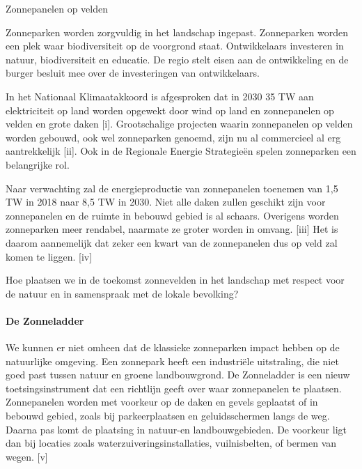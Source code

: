 \begin{voorstel}{Zonnepanelen op velden}


\begin{samenvatting}
Zonneparken worden zorgvuldig in het landschap ingepast. Zonneparken worden een plek waar biodiversiteit op de voorgrond staat. Ontwikkelaars investeren in natuur, biodiversiteit en educatie. De regio stelt eisen aan de ontwikkeling en de burger besluit mee over de investeringen van ontwikkelaars.
\end{samenvatting}

\begin{multicols}{2}

\begin{uitdaging}
In het Nationaal Klimaatakkoord is afgesproken dat in 2030 35 TW aan elektriciteit op land worden opgewekt door wind op land en zonnepanelen op velden en grote daken [i]. Grootschalige projecten waarin zonnepanelen op velden worden gebouwd, ook wel zonneparken genoemd, zijn nu al commercieel al erg aantrekkelijk [ii]. Ook in de Regionale Energie Strategieën spelen zonneparken een belangrijke rol.

Naar verwachting zal de energieproductie van zonnepanelen toenemen van 1,5 TW in 2018 naar 8,5 TW in 2030. Niet alle daken zullen geschikt zijn voor zonnepanelen en de ruimte in bebouwd gebied is al schaars. Overigens worden zonneparken meer rendabel, naarmate ze groter worden in omvang. [iii] Het is daarom aannemelijk dat zeker een kwart van de zonnepanelen dus op veld zal komen te liggen. [iv]

Hoe plaatsen we in de toekomst zonnevelden in het landschap met respect voor de natuur en in samenspraak met de lokale bevolking?
\end{uitdaging}

\begin{overwegingen}
\paragraph{De Zonneladder}
We kunnen er niet omheen dat de klassieke zonneparken impact hebben op de natuurlijke omgeving. Een zonnepark heeft een industriële uitstraling, die niet goed past tussen natuur en groene landbouwgrond. De Zonneladder is een nieuw toetsingsinstrument dat een richtlijn geeft over waar zonnepanelen te plaatsen. Zonnepanelen worden met voorkeur op de daken en gevels geplaatst of in bebouwd gebied, zoals bij parkeerplaatsen en geluidsschermen langs de weg. Daarna pas komt de plaatsing in natuur-en landbouwgebieden. De voorkeur ligt dan bij locaties zoals waterzuiveringsinstallaties, vuilnisbelten, of bermen van wegen. [v]

\end{overwegingen}
\end{multicols}
\end{voorstel}
